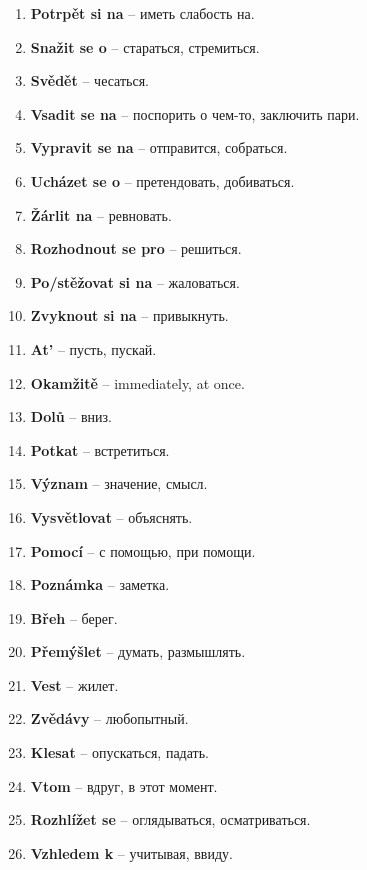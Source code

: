 \documentclass[12pt]{book}
\begin{document}
\begin{enumerate}
    \item \textbf{Potrpět si na} -- \textrussian{иметь слабость на}.
    \item \textbf{Snažit se o} -- \textrussian{стараться, стремиться}.
    \item \textbf{Svědět} -- \textrussian{чесаться}.
    \item \textbf{Vsadit se na} -- \textrussian{поспорить о чем-то, заключить пари}.
    \item \textbf{Vypravit se na} -- \textrussian{отправится, собраться}.
    \item \textbf{Ucházet se o} -- \textrussian{претендовать, добиваться}.
    \item \textbf{Žárlit na} -- \textrussian{ревновать}.
    \item \textbf{Rozhodnout se pro} -- \textrussian{решиться}.
    \item \textbf{Po/stěžovat si na} -- \textrussian{жаловаться}.
    \item \textbf{Zvyknout si na} -- \textrussian{привыкнуть}.
    \item \textbf{At'} -- \textrussian{пусть, пускай}.
    \item \textbf{Okamžitě} -- immediately, at once.
    \item \textbf{Dolů} -- \textrussian{вниз}.
    \item \textbf{Potkat} -- \textrussian{встретиться}.
    \item \textbf{Význam} -- \textrussian{значение, смысл}.
    \item \textbf{Vysvětlovat} -- \textrussian{объяснять}.
    \item \textbf{Pomocí} -- \textrussian{с помощью, при помощи}.
    \item \textbf{Poznámka} -- \textrussian{заметка}.
    \item \textbf{Břeh} -- \textrussian{берег}.
    \item \textbf{Přemýšlet} -- \textrussian{думать, размышлять}.
    \item \textbf{Vest} -- \textrussian{жилет}.
    \item \textbf{Zvědávy} -- \textrussian{любопытный}.
    \item \textbf{Klesat} -- \textrussian{опускаться, падать}.
    \item \textbf{Vtom} -- \textrussian{вдруг, в этот момент}.
    \item \textbf{Rozhlížet se} -- \textrussian{оглядываться, осматриваться}.
    \item \textbf{Vzhledem k} -- \textrussian{учитывая, ввиду}.

\end{enumerate}
\end{document}
